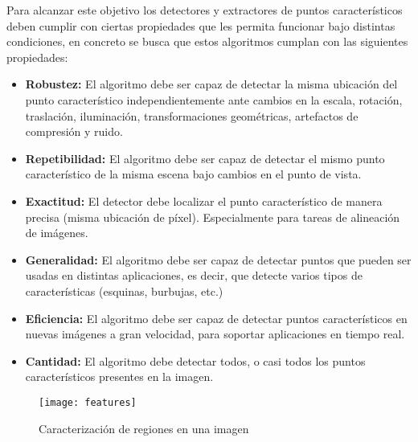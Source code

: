 Para alcanzar este objetivo los detectores y extractores de puntos característicos deben cumplir con ciertas propiedades que les permita funcionar bajo distintas condiciones, en concreto se busca que estos algoritmos cumplan con las siguientes propiedades:

\begin{itemize}
	\item \textbf{Robustez:} El algoritmo debe ser capaz de detectar la misma ubicación del punto característico independientemente ante cambios en la escala, rotación, traslación, iluminación, transformaciones geométricas, artefactos de compresión y ruido.
	
	\item \textbf{Repetibilidad:} El algoritmo debe ser capaz de detectar el mismo punto característico de la misma escena bajo cambios en el punto de vista.
	
	\item \textbf{Exactitud:} El detector debe localizar el punto característico de manera precisa (misma ubicación de píxel). Especialmente para tareas de alineación de imágenes.
	
	\item \textbf{Generalidad:} El algoritmo debe ser capaz de detectar puntos que pueden ser usadas en distintas aplicaciones, es decir, que detecte varios tipos de características (esquinas, burbujas, etc.)
	
	\item \textbf{Eficiencia:} El algoritmo debe ser capaz de detectar puntos característicos en nuevas imágenes a gran velocidad, para soportar aplicaciones en tiempo real.
	
	\item \textbf{Cantidad:} El algoritmo debe detectar todos, o casi todos los puntos característicos presentes en la imagen. 
	
\end{itemize}



\begin{figure}[H]
	\centering
	\texttt{[image: features]}
	\caption[Caracterización de regiones en una imagen]{Caracterización de regiones en una imagen\protect\footnotemark}
	\label{imagen:features}
\end{figure}

